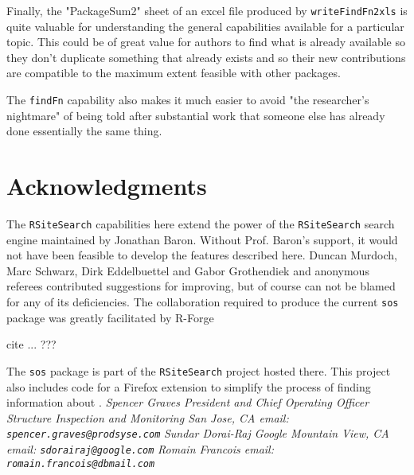 Finally, the "PackageSum2" sheet of an excel file produced by 
{\tt writeFindFn2xls} is quite valuable for understanding the 
general capabilities available for a particular topic.  
This could be of great value for authors to find what is already 
available so they don't duplicate something that already exists 
and so their new contributions are compatible to the maximum extent
feasible with other packages.  

The {\tt findFn} capability also makes it much easier 
to avoid "the researcher's nightmare" of being told after 
substantial work that someone else has already done essentially 
the same thing.  


\section*{Acknowledgments}
The {\tt RSiteSearch} capabilities here extend the power of the
{\tt RSiteSearch} search engine maintained by Jonathan Baron.
Without Prof. Baron's support, it would not have been feasible
to develop the features described here.  Duncan Murdoch, Marc Schwarz,
Dirk Eddelbuettel and Gabor Grothendiek and anonymous
referees contributed suggestions for improving, but of course
can not be blamed for any of its deficiencies.  The collaboration
required to produce the current {\tt sos} package was greatly
facilitated by R-Forge

cite ... ???


The {\tt sos} package is part of the {\tt RSiteSearch} project
hosted there.  This project also includes code for a Firefox
extension to simplify the process of finding information about
\R{}.
\newline \newline
\emph{Spencer Graves \newline
President and Chief Operating Officer \newline
Structure Inspection and Monitoring \newline
San Jose, CA \newline
email:  {\tt spencer.graves@prodsyse.com} }
\newline \newline
\emph{Sundar Dorai-Raj \newline
Google \newline
Mountain View, CA \newline
email:  {\tt sdorairaj@google.com} }
\newline \newline
\emph{Romain Francois \newline
\newline
\newline
email:  {\tt romain.francois@dbmail.com} }

